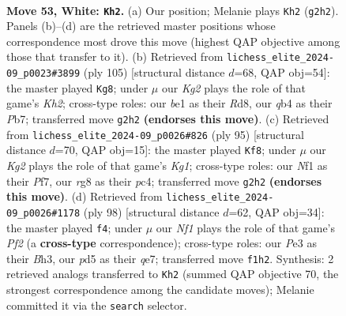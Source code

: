 \documentclass[11pt]{article}
\begin{document}
\clearpage

\begin{figure}[p]\centering
\begin{subfigure}{0.46\textwidth}\centering
\resizebox{\linewidth}{!}{%
\newchessgame
\chessboard[
  setfen={r5r1/p2k2pQ/7p/3p3P/pq1P2P1/4P3/6K1/4bN2 w - - 14 53},
  showmover=false,
  pgfstyle=straightmove, color=movearrow, markmove={g2-h2}
]}
\caption{}
\end{subfigure}\hfill
\begin{subfigure}{0.46\textwidth}\centering
\resizebox{\linewidth}{!}{%
\newchessgame
\chessboard[
  setfen={3r4/1p3p1k/1P1p2p1/p2P3p/P1P5/2Q1R2P/5qPK/8 b - - 15 53},
  showmover=false,
  pgfstyle=straightmove, color=movearrow, markmove={h7-g8}
]}
\caption{}
\end{subfigure}
\\[4pt]
\begin{subfigure}{0.46\textwidth}\centering
\resizebox{\linewidth}{!}{%
\newchessgame
\chessboard[
  setfen={6k1/5pp1/4p2p/2q4P/2P5/3B4/p4PP1/R3R1K1 b - - 1 48},
  showmover=false,
  pgfstyle=straightmove, color=movearrow, markmove={g8-f8}
]}
\caption{}
\end{subfigure}\hfill
\begin{subfigure}{0.46\textwidth}\centering
\resizebox{\linewidth}{!}{%
\newchessgame
\chessboard[
  setfen={4r1k1/4q1p1/p3p3/2p1Q1P1/2P5/1P5B/5P2/6K1 w - - 2 50},
  showmover=false,
  pgfstyle=straightmove, color=movearrow, markmove={f2-f4}
]}
\caption{}
\end{subfigure}
\caption{\textbf{Move 53, White: \texttt{Kh2}.} (a) Our position; Melanie plays \texttt{Kh2} (\texttt{g2h2}). Panels (b)--(d) are the retrieved master positions whose correspondence most drove this move (highest QAP objective among those that transfer to it). (b) Retrieved from \texttt{lichess\_elite\_2024-09\_p0023\#3899} (ply 105) [structural distance $d$=68, QAP obj=54]: the master played \texttt{Kg8}; under $\mu$ our \emph{Kg2} plays the role of that game's \emph{Kh2}; cross-type roles: our \emph{b}e1 as their \emph{R}d8, our \emph{q}b4 as their \emph{P}b7; transferred move \texttt{g2h2} \textbf{(endorses this move)}. (c) Retrieved from \texttt{lichess\_elite\_2024-09\_p0026\#826} (ply 95) [structural distance $d$=70, QAP obj=15]: the master played \texttt{Kf8}; under $\mu$ our \emph{Kg2} plays the role of that game's \emph{Kg1}; cross-type roles: our \emph{N}f1 as their \emph{P}f7, our \emph{r}g8 as their \emph{p}c4; transferred move \texttt{g2h2} \textbf{(endorses this move)}. (d) Retrieved from \texttt{lichess\_elite\_2024-09\_p0026\#1178} (ply 98) [structural distance $d$=62, QAP obj=34]: the master played \texttt{f4}; under $\mu$ our \emph{Nf1} plays the role of that game's \emph{Pf2} (a \textbf{cross-type} correspondence); cross-type roles: our \emph{P}e3 as their \emph{B}h3, our \emph{p}d5 as their \emph{q}e7; transferred move \texttt{f1h2}. Synthesis: 2 retrieved analogs transferred to \texttt{Kh2} (summed QAP objective 70, the strongest correspondence among the candidate moves); Melanie committed it via the \texttt{search} selector.}
\label{fig:thought-m104}
\end{figure}
\end{document}
